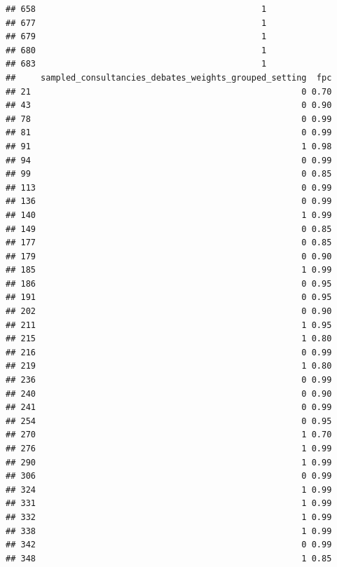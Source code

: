 \documentclass[
]{article}
\begin{document}
\begin{verbatim}
## 658                                             1
## 677                                             1
## 679                                             1
## 680                                             1
## 683                                             1
##     sampled_consultancies_debates_weights_grouped_setting  fpc
## 21                                                      0 0.70
## 43                                                      0 0.90
## 78                                                      0 0.99
## 81                                                      0 0.99
## 91                                                      1 0.98
## 94                                                      0 0.99
## 99                                                      0 0.85
## 113                                                     0 0.99
## 136                                                     0 0.99
## 140                                                     1 0.99
## 149                                                     0 0.85
## 177                                                     0 0.85
## 179                                                     0 0.90
## 185                                                     1 0.99
## 186                                                     0 0.95
## 191                                                     0 0.95
## 202                                                     0 0.90
## 211                                                     1 0.95
## 215                                                     1 0.80
## 216                                                     0 0.99
## 219                                                     1 0.80
## 236                                                     0 0.99
## 240                                                     0 0.90
## 241                                                     0 0.99
## 254                                                     0 0.95
## 270                                                     1 0.70
## 276                                                     1 0.99
## 290                                                     1 0.99
## 306                                                     0 0.99
## 324                                                     1 0.99
## 331                                                     1 0.99
## 332                                                     1 0.99
## 338                                                     1 0.99
## 342                                                     0 0.99
## 348                                                     1 0.85

\end{verbatim}
\end{document}
